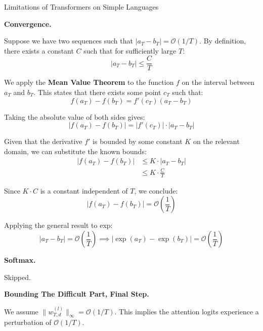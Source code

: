\begin{question}{Limitations of Transformers on Simple Languages}
\begin{subquestion}{\textbf{Convergence.}}

    Suppose we have two sequences such that $|a_T - b_T| = \mathcal{O}(1/T)$. By definition, there exists a constant $C$ such that for sufficiently large $T$:
    \begin{equation}
    |a_T - b_T| \le \frac{C}{T}
    \end{equation}

    We apply the \textbf{Mean Value Theorem} to the function $f$ on the interval between $a_T$ and $b_T$. This states that there exists some point $c_T$ such that:
    \begin{equation}
    f(a_T) - f(b_T) = f'(c_T)(a_T - b_T)
    \end{equation}

    Taking the absolute value of both sides gives:
    \begin{equation}
    |f(a_T) - f(b_T)| = |f'(c_T)| \cdot |a_T - b_T|
    \end{equation}

    Given that the derivative $f'$ is bounded by some constant $K$ on the relevant domain, we can substitute the known bounds:
    \begin{align*}
    |f(a_T) - f(b_T)| &\le K \cdot |a_T - b_T| \\
    &\le K \cdot \frac{C}{T}
    \end{align*}

    Since $K \cdot C$ is a constant independent of $T$, we conclude:
    \begin{equation}
    |f(a_T) - f(b_T)| = \mathcal{O}\left(\frac{1}{T}\right)
    \end{equation}

    Applying the general result to exp:
    \begin{equation}
    |a_T - b_T| = \mathcal{O}\left(\frac{1}{T}\right) \implies |\exp(a_T) - \exp(b_T)| = \mathcal{O}\left(\frac{1}{T}\right)
    \end{equation}
\end{subquestion}

\begin{subquestion}{\textbf{Softmax.}}

    Skipped.
\end{subquestion}

\begin{subquestion}{\textbf{Bounding The Difficult Part, Final Step.}}

    We assume $\|w_{T,d}^{(l)}\|_{\infty} = \mathcal{O}(1/T)$. This implies the attention logits experience a perturbation of $\mathcal{O}(1/T)$. 


\end{subquestion}
\end{question}
